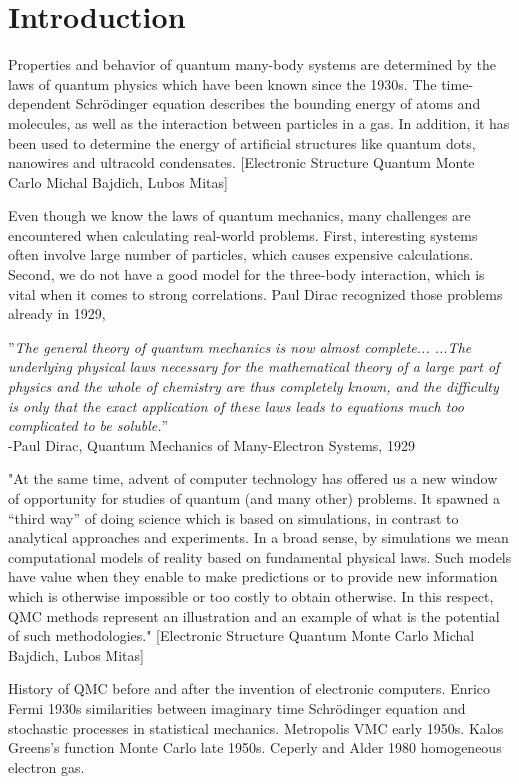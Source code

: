 \chapter{Introduction}
Properties and behavior of quantum many-body systems are determined by the laws of quantum physics which have been known since the 1930s. The time-dependent Schrödinger equation describes the bounding energy of atoms and molecules, as well as the interaction between particles in a gas. In addition, it has been used to determine the energy of artificial structures like quantum dots, nanowires and ultracold condensates. [Electronic Structure Quantum Monte Carlo Michal Bajdich, Lubos Mitas] 

Even though we know the laws of quantum mechanics, many challenges are encountered when calculating real-world problems. First, interesting systems often involve large number of particles, which causes expensive calculations. Second, we do not have a good model for the three-body interaction, which is vital when it comes to strong correlations. Paul Dirac recognized those problems already in 1929, 

''\textit{The general theory of quantum mechanics is now almost complete... ...The underlying physical laws necessary for the mathematical theory of a large part of physics and the whole of chemistry are thus completely known, and the difficulty is only that the exact application of these laws leads to equations much too complicated to be soluble.}''\\ 

-Paul Dirac, Quantum Mechanics of Many-Electron Systems, 1929 \bigskip

"At the same time, advent of computer technology has
offered us a new window of opportunity for studies of quantum (and many other) problems. It
spawned a “third way” of doing science which is based on simulations, in contrast to analytical
approaches and experiments. In a broad sense, by simulations we mean computational models of
reality based on fundamental physical laws. Such models have value when they enable to make
predictions or to provide new information which is otherwise impossible or too costly to obtain
otherwise. In this respect, QMC methods represent an illustration and an example of what is the
potential of such methodologies." [Electronic Structure Quantum Monte Carlo Michal Bajdich, Lubos Mitas] 

History of QMC before and after the invention of electronic computers. Enrico Fermi 1930s similarities between imaginary time Schrödinger equation and stochastic processes in statistical mechanics. Metropolis VMC early 1950s. Kalos Greens's function Monte Carlo late 1950s. Ceperly and Alder 1980 homogeneous electron gas.  

